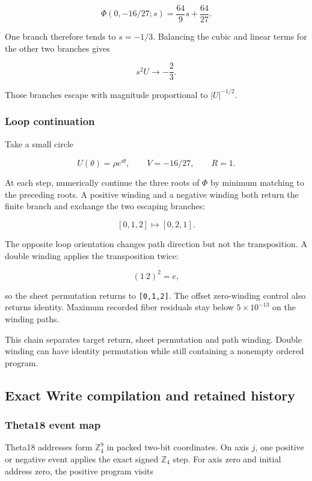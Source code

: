 \[
\Phi(0,-16/27;s)
=\frac{64}{9}s+\frac{64}{27}.
\]

One branch therefore tends to \(s=-1/3\). Balancing the cubic and linear
terms for the other two branches gives

\[
s^2U\longrightarrow-\frac23.
\]

Those branches escape with magnitude proportional to \(|U|^{-1/2}\).

\subsubsection{Loop continuation}\label{viii-ch11-loop-continuation}

Take a small circle

\[
U(\theta)=\rho e^{i\theta},
\qquad
V=-16/27,
\qquad
R=1.
\]

At each step, numerically continue the three roots of \(\Phi\) by
minimum matching to the preceding roots. A positive winding and a
negative winding both return the finite branch and exchange the two
escaping branches:

\[
[0,1,2]\longmapsto[0,2,1].
\]

The opposite loop orientation changes path direction but not the
transposition. A double winding applies the transposition twice:

\[
(1\ 2)^2=e,
\]

so the sheet permutation returns to \texttt{{[}0,1,2{]}}. The offset
zero-winding control also returns identity. Maximum recorded fiber
residuals stay below \(5\times10^{-13}\) on the winding paths.

This chain separates target return, sheet permutation and path winding.
Double winding can have identity permutation while still containing a
nonempty ordered program.

\subsection{Exact Write compilation and retained
history}\label{viii-ch11-exact-write-compilation-and-retained-history}

\subsubsection{Theta18 event map}\label{viii-ch11-theta18-event-map}

Theta18 addresses form \(\mathbb Z_4^9\) in packed two-bit coordinates.
On axis \(j\), one positive or negative event applies the exact signed
\(\mathbb Z_4\) step. For axis zero and initial address zero, the
positive program visits


